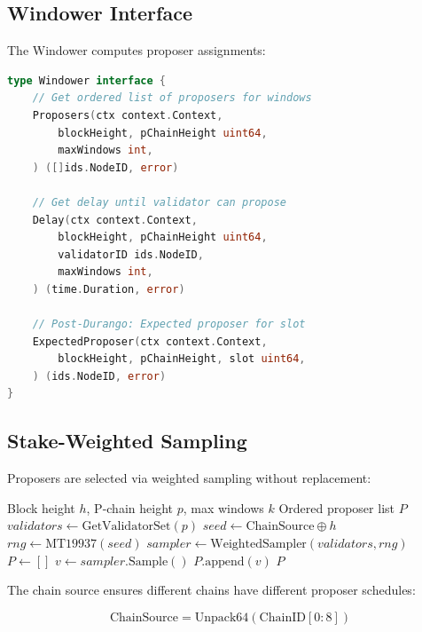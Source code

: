 \documentclass[11pt,letterpaper]{article}
\begin{document}
\subsection{Windower Interface}

The Windower computes proposer assignments:

\begin{lstlisting}[language=Go, caption=Windower Interface]
type Windower interface {
    // Get ordered list of proposers for windows
    Proposers(ctx context.Context,
        blockHeight, pChainHeight uint64,
        maxWindows int,
    ) ([]ids.NodeID, error)

    // Get delay until validator can propose
    Delay(ctx context.Context,
        blockHeight, pChainHeight uint64,
        validatorID ids.NodeID,
        maxWindows int,
    ) (time.Duration, error)

    // Post-Durango: Expected proposer for slot
    ExpectedProposer(ctx context.Context,
        blockHeight, pChainHeight, slot uint64,
    ) (ids.NodeID, error)
}
\end{lstlisting}

\subsection{Stake-Weighted Sampling}

Proposers are selected via weighted sampling without replacement:

\begin{algorithm}
\caption{Proposer Selection for Height $h$}
\label{alg:selection}
\begin{algorithmic}[1]
\Require Block height $h$, P-chain height $p$, max windows $k$
\Ensure Ordered proposer list $P$
\State $validators \gets \text{GetValidatorSet}(p)$
\State $seed \gets \text{ChainSource} \oplus h$
\State $rng \gets \text{MT19937}(seed)$
\State $sampler \gets \text{WeightedSampler}(validators, rng)$
\State $P \gets []$
    \State $v \gets sampler.\text{Sample}()$
    \State $P.\text{append}(v)$
\EndFor
\State \Return $P$
\end{algorithmic}
\end{algorithm}

The chain source ensures different chains have different proposer schedules:

\begin{equation}
\text{ChainSource} = \text{Unpack64}(\text{ChainID}[0:8])
\end{equation}
\end{document}
